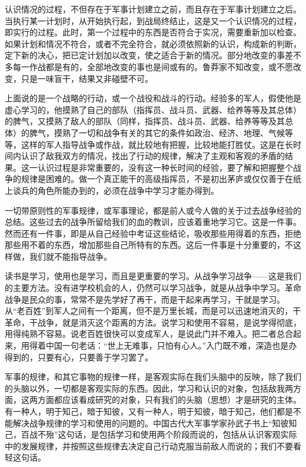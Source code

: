 认识情况的过程，不但存在于军事计划建立之前，而且存在于军事计划建立之后。当执行某一计划时，从开始执行起，到战局终结止，这是又一个认识情况的过程，即实行的过程。此时，第一个过程中的东西是否符合于实况，需要重新加以检查。如果计划和情况不符合，或者不完全符合，就必须依照新的认识，构成新的判断，定下新的决心，把已定计划加以改变，使之适合于新的情况。部分地改变的事差不多每一作战都是有的，全部地改变的事也是间或有的。鲁莽家不知改变，或不愿改变，只是一味盲干，结果又非碰壁不可。

上面说的是一个战略的行动，或一个战役和战斗的行动。经验多的军人，假使他是虚心学习的，他摸熟了自己的部队（指挥员、战斗员、武器、给养等等及其总体）的脾气，又摸熟了敌人的部队（同样，指挥员、战斗员、武器、给养等等及其总体）的脾气，摸熟了一切和战争有关的其它的条件如政治、经济、地理、气候等等，这样的军人指导战争或作战，就比较地有把握，比较地能打胜仗。这是在长时间内认识了敌我双方的情况，找出了行动的规律，解决了主观和客观的矛盾的结果。这一认识过程是非常重要的，没有这一种长时间的经验，要了解和把握整个战争的规律是困难的。做一个真正能干的高级指挥员，不是初出茅庐或仅仅善于在纸上谈兵的角色所能办到的，必须在战争中学习才能办得到。

一切带原则性的军事规律，或军事理论，都是前人或今人做的关于过去战争经验的总结。这些过去的战争所留给我们的血的教训，应该着重地学习它。这是一件事。然而还有一件事，即是从自己经验中考证这些结论，吸收那些用得着的东西，拒绝那些用不着的东西，增加那些自己所特有的东西。这后一件事是十分重要的，不这样做，我们就不能指导战争。

读书是学习，使用也是学习，而且是更重要的学习。从战争学习战争——这是我们的主要方法。没有进学校机会的人，仍然可以学习战争，就是从战争中学习。革命战争是民众的事，常常不是先学好了再干，而是干起来再学习，干就是学习。从“老百姓”到军人之间有一个距离，但不是万里长城，而是可以迅速地消灭的，干革命，干战争，就是消灭这个距离的方法。说学习和使用不容易，是说学得彻底，用得纯熟不容易。说老百姓很快可以变成军人，是说此门并不难入。把二者总合起来，用得着中国一句老话：“世上无难事，只怕有心人。”入门既不难，深造也是办得到的，只要有心，只要善于学习罢了。

军事的规律，和其它事物的规律一样，是客观实际在我们头脑中的反映，除了我们的头脑以外，一切都是客观实际的东西。因此，学习和认识的对象，包括敌我两方面，这两方面都应该看成研究的对象，只有我们的头脑（思想）才是研究的主体。有一种人，明于知己，暗于知彼，又有一种人，明于知彼，暗于知己，他们都是不能解决战争规律的学习和使用的问题的。中国古代大军事学家孙武子书上“知彼知己，百战不殆”这句话，是包括学习和使用两个阶段而说的，包括从认识客观实际中的发展规律，并按照这些规律去决定自己行动克服当前敌人而说的；我们不要看轻这句话。

